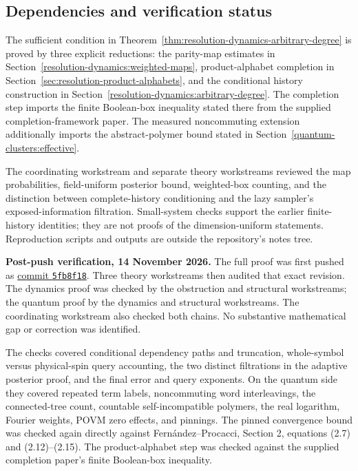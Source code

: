 \subsection{Dependencies and verification status}
\label{resolution-dynamics:status}

The sufficient condition in
Theorem~\ref{thm:resolution-dynamics-arbitrary-degree} is proved by
three explicit reductions: the parity-map estimates in
Section~\ref{resolution-dynamics:weighted-maps}, product-alphabet
completion in Section~\ref{sec:resolution-product-alphabets}, and
the conditional history construction in
Section~\ref{resolution-dynamics:arbitrary-degree}.
The completion step imports the finite Boolean-box inequality stated
there from the supplied completion-framework paper. The measured
noncommuting extension additionally imports the abstract-polymer
bound stated in Section~\ref{quantum-clusters:effective}.

The coordinating workstream and separate theory workstreams reviewed
the map probabilities, field-uniform posterior bound, weighted-box
counting, and the distinction between complete-history conditioning
and the lazy sampler's exposed-information filtration. Small-system
checks support the earlier finite-history identities; they are not
proofs of the dimension-uniform statements. Reproduction scripts and
outputs are outside the repository's notes tree.

\textbf{Post-push verification, 14 November 2026.}
The full proof was first pushed as
\href{https://github.com/qedsphere/AAconjecture/commit/5fb8f1880dba0bb8798a0a015a82759f5bd5fb1f}
{commit \texttt{5fb8f18}}. Three theory workstreams then audited that
exact revision. The dynamics proof was checked by the obstruction and
structural workstreams; the quantum proof by the dynamics and structural
workstreams. The coordinating workstream also checked both chains.
No substantive mathematical gap or correction was identified.

The checks covered conditional dependency paths and truncation,
whole-symbol versus physical-spin query accounting, the two distinct
filtrations in the adaptive posterior proof, and the final error and
query exponents. On the quantum side they covered repeated term labels,
noncommuting word interleavings, the connected-tree count, countable
self-incompatible polymers, the real logarithm, Fourier weights, POVM
zero effects, and pinnings. The pinned convergence bound was checked
again directly against Fern\'andez--Procacci, Section 2, equations
(2.7) and (2.12)--(2.15). The product-alphabet step was checked against
the supplied completion paper's finite Boolean-box inequality.

